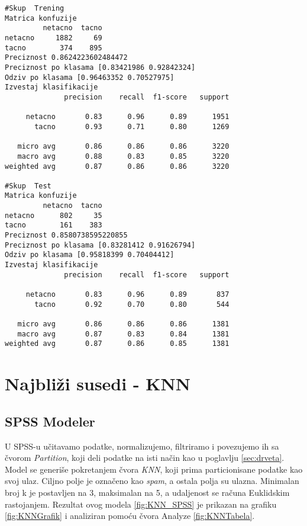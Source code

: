 \documentclass[a4paper]{article}
\begin{document}
\begin{lstlisting}[caption={Rezultat nad trening i test podacima},frame=single, label=TreningTree]
#Skup  Trening
Matrica konfuzije
         netacno  tacno
netacno     1882     69
tacno        374    895
Preciznost 0.8624223602484472
Preciznost po klasama [0.83421986 0.92842324]
Odziv po klasama [0.96463352 0.70527975]
Izvestaj klasifikacije
              precision    recall  f1-score   support

     netacno       0.83      0.96      0.89      1951
       tacno       0.93      0.71      0.80      1269

   micro avg       0.86      0.86      0.86      3220
   macro avg       0.88      0.83      0.85      3220
weighted avg       0.87      0.86      0.86      3220

#Skup  Test
Matrica konfuzije
         netacno  tacno
netacno      802     35
tacno        161    383
Preciznost 0.8580738595220855
Preciznost po klasama [0.83281412 0.91626794]
Odziv po klasama [0.95818399 0.70404412]
Izvestaj klasifikacije
              precision    recall  f1-score   support

     netacno       0.83      0.96      0.89       837
       tacno       0.92      0.70      0.80       544

   micro avg       0.86      0.86      0.86      1381
   macro avg       0.87      0.83      0.84      1381
weighted avg       0.87      0.86      0.85      1381
\end{lstlisting} 


\section{Najbliži susedi - KNN}
\label{sec:knn}

\subsection{SPSS Modeler}

U SPSS-u učitavamo podatke, normalizujemo, filtriramo i povezujemo ih sa čvorom \textit{Partition}, koji deli podatke na isti način kao u poglavlju \ref{sec:drveta}. Model se generiše pokretanjem čvora \textit{KNN}, koji prima particionisane podatke kao svoj ulaz. Ciljno polje je označeno kao \textit{spam}, a ostala polja su ulazna. Minimalan broj k je postavljen na 3,  maksimalan na 5, a udaljenost se računa Euklidskim rastojanjem.
Rezultat ovog modela \ref{fig:KNN_SPSS} je prikazan na grafiku \ref{fig:KNNGrafik} i analiziran pomoću čvora Analyze \ref{fig:KNNTabela}.
\end{document}
